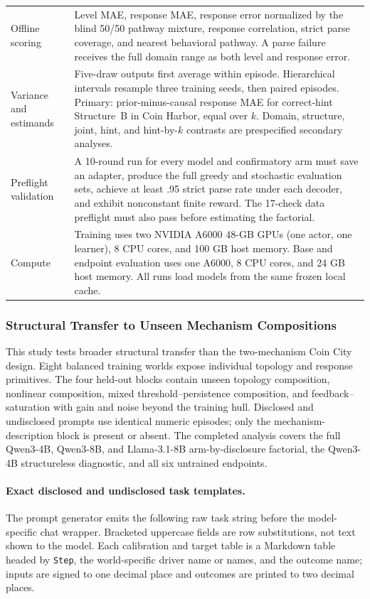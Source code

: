 \begin{center}
\begin{minipage}{\linewidth}
\begin{tabular}{p{.29\linewidth}p{.66\linewidth}}
Offline scoring & Level MAE, response MAE, response error normalized by the
blind 50/50 pathway mixture, response correlation, strict parse coverage, and
nearest behavioral pathway. A parse failure receives the full domain range as
both level and response error. \\
Variance and estimands & Five-draw outputs first average within episode.
Hierarchical intervals resample three training seeds, then paired episodes.
Primary: prior-minus-causal response MAE for correct-hint Structure~B in Coin
Harbor, equal over $k$. Domain, structure, joint, hint, and hint-by-$k$ contrasts
are prespecified secondary analyses. \\
Preflight validation & A 10-round run for every model and confirmatory arm must
save an adapter, produce the full greedy and stochastic evaluation sets, achieve
at least .95 strict parse rate under each decoder, and exhibit nonconstant finite
reward. The 17-check data preflight must also pass before estimating the factorial. \\
Compute & Training uses two NVIDIA A6000 48-GB GPUs (one actor, one learner),
8 CPU cores, and 100 GB host memory. Base and endpoint evaluation uses one A6000,
8 CPU cores, and 24 GB host memory. All runs load models from the same frozen
local cache. \\
\bottomrule
\end{tabular}
\end{minipage}
\end{center}

\subsubsection{Structural Transfer to Unseen Mechanism Compositions}
\label{app:exp3-expanded-structural-ood}

This study tests broader structural transfer than the
two-mechanism Coin City design. Eight balanced training worlds expose individual
topology and response primitives. The four held-out blocks contain unseen topology
composition, nonlinear composition, mixed threshold--persistence composition, and
feedback--saturation with gain and noise beyond the training hull. Disclosed and
undisclosed prompts use identical
numeric episodes; only the mechanism-description block is present or absent. The
completed analysis covers the full Qwen3-4B, Qwen3-8B, and
Llama-3.1-8B arm-by-disclosure factorial, the Qwen3-4B structureless diagnostic,
and all six untrained endpoints.

\paragraph{Exact disclosed and undisclosed task templates.}
\label{app:exp3-structural-prompts}
The prompt generator emits the following raw task string before the
model-specific chat wrapper. Bracketed uppercase fields are row substitutions,
not text shown to the model. Each calibration and target table is a Markdown
table headed by \texttt{Step}, the world-specific driver name or names, and the
outcome name; inputs are signed to one decimal place and outcomes are printed to
two decimal places.

